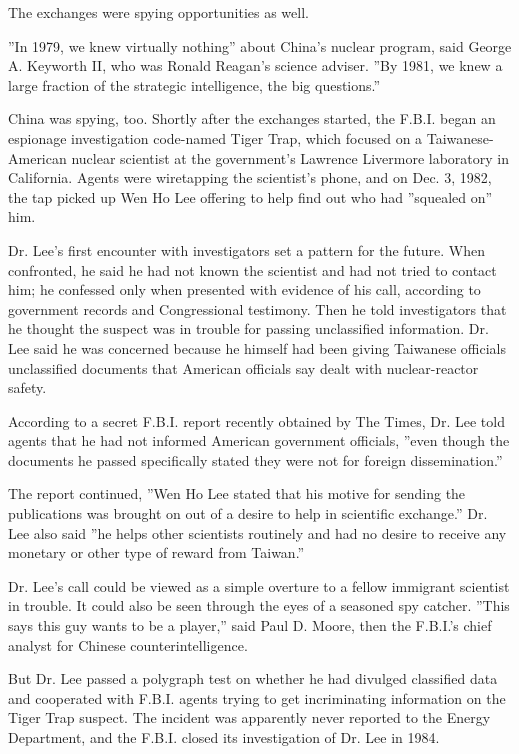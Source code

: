 The exchanges were spying opportunities as well.

''In 1979, we knew virtually nothing'' about China's nuclear program,
said George A. Keyworth II, who was Ronald Reagan's science adviser.
''By 1981, we knew a large fraction of the strategic intelligence, the
big questions.''

China was spying, too. Shortly after the exchanges started, the F.B.I.
began an espionage investigation code-named Tiger Trap, which focused on
a Taiwanese-American nuclear scientist at the government's Lawrence
Livermore laboratory in California. Agents were wiretapping the
scientist's phone, and on Dec. 3, 1982, the tap picked up Wen Ho Lee
offering to help find out who had ''squealed on'' him.

Dr. Lee's first encounter with investigators set a pattern for the
future. When confronted, he said he had not known the scientist and had
not tried to contact him; he confessed only when presented with evidence
of his call, according to government records and Congressional
testimony. Then he told investigators that he thought the suspect was in
trouble for passing unclassified information. Dr. Lee said he was
concerned because he himself had been giving Taiwanese officials
unclassified documents that American officials say dealt with
nuclear-reactor safety.

According to a secret F.B.I. report recently obtained by The Times, Dr.
Lee told agents that he had not informed American government officials,
''even though the documents he passed specifically stated they were not
for foreign dissemination.''

The report continued, ''Wen Ho Lee stated that his motive for sending
the publications was brought on out of a desire to help in scientific
exchange.'' Dr. Lee also said ''he helps other scientists routinely and
had no desire to receive any monetary or other type of reward from
Taiwan.''

Dr. Lee's call could be viewed as a simple overture to a fellow
immigrant scientist in trouble. It could also be seen through the eyes
of a seasoned spy catcher. ''This says this guy wants to be a player,''
said Paul D. Moore, then the F.B.I.'s chief analyst for Chinese
counterintelligence.

But Dr. Lee passed a polygraph test on whether he had divulged
classified data and cooperated with F.B.I. agents trying to get
incriminating information on the Tiger Trap suspect. The incident was
apparently never reported to the Energy Department, and the F.B.I.
closed its investigation of Dr. Lee in 1984.

